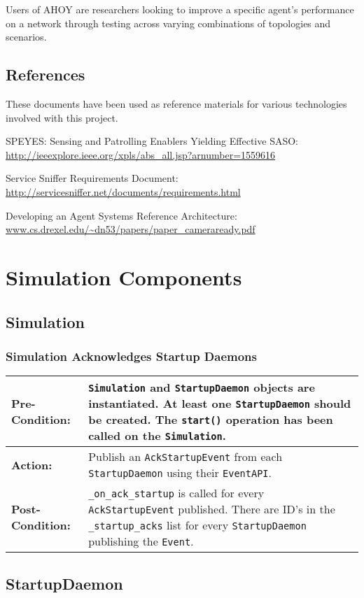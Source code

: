 \documentclass[titlepage]{article}
\renewenvironment{itemize*}
    {\begin{itemize}
        \setlength{\itemsep}{0pt}%
        \setlength{\parskip}{0pt}%
        \setlength{\partopsep}{0pt}%
        \setlength{\topsep}{0pt}}%
    {\end{itemize}}
\newcommand{\testcase}[3]{
    \begin{center}
    \begin{tabular}{| l | p{0.7\textwidth}|}
        \hline
        \rowcolor[gray]{0.8}\textbf{Pre-Condition:} & #1 \\ \hline
        \textbf{Action:} & #2 \\ \hline
        \rowcolor[gray]{0.8}\textbf{Post-Condition:} & #3 \\ \hline
    \end{tabular}
    \end{center}
}
\begin{document}
Users of AHOY are researchers looking to improve a specific agent's performance on a network through testing across varying combinations of topologies and scenarios.

\subsection{References%
  \label{references}%
}

These documents have been used as reference materials for various technologies involved with this project.
%
\begin{itemize*}
	\item SPEYES: Sensing and Patrolling Enablers Yielding Effective SASO: \url{http://ieeexplore.ieee.org/xpls/abs\_all.jsp?arnumber=1559616}
	\item Service Sniffer Requirements Document: \url{http://servicesniffer.net/documents/requirements.html}
    \item Developing an Agent Systems Reference Architecture: \url{www.cs.drexel.edu/~dn53/papers/paper\_cameraready.pdf}
\end{itemize*}

\section{Simulation Components}
\subsection{Simulation}

\subsubsection{Simulation Acknowledges Startup Daemons}

\testcase{\texttt{Simulation} and \texttt{StartupDaemon} objects are instantiated. At least one \texttt{StartupDaemon} should be created. The \texttt{start()} operation has been called on the \texttt{Simulation}. }{Publish an \texttt{AckStartupEvent} from each \texttt{StartupDaemon} using their \texttt{EventAPI}.}{\texttt{\_on\_ack\_startup} is called for every \texttt{AckStartupEvent} published.  There are ID's in the \texttt{\_startup\_acks} list for every \texttt{StartupDaemon} publishing the \texttt{Event}.}

\subsection{StartupDaemon}
\end{document}

